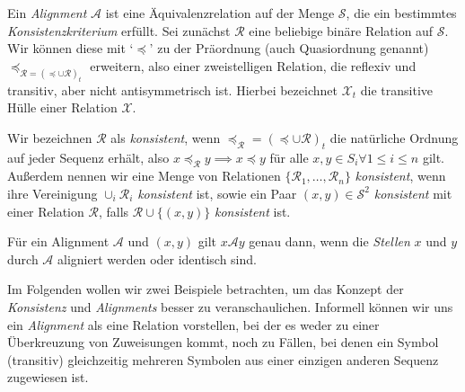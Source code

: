 \begin{definition}
	Ein \emph{Alignment} $\mathcal{A}$ ist eine Äquivalenzrelation auf der Menge $\mathcal{S}$, die ein bestimmtes \emph{Konsistenzkriterium} erfüllt. Sei zunächst $\mathcal{R}$ eine beliebige binäre Relation auf $\mathcal{S}$. Wir können diese mit `$\preceq$' zu der Präordnung (auch Quasiordnung genannt) $\preceq_{\mathcal{R}=(\preceq \cup \mathcal{R})_t}$ erweitern, also einer zweistelligen Relation, die reflexiv und transitiv, aber nicht antisymmetrisch ist. Hierbei bezeichnet $\mathcal{X}_t$ die transitive Hülle einer Relation $\mathcal{X}$. 
	
	Wir bezeichnen $\mathcal{R}$ als \emph{konsistent}, wenn $\preceq_{\mathcal{R}}=(\preceq \cup \mathcal{R})_t$ die natürliche Ordnung auf jeder Sequenz erhält, also $x \preceq_{\mathcal{R}} y \implies x \preceq y$ für alle $x,y \in S_i \forall 1\leq i \leq n$ gilt. Außerdem nennen wir eine Menge von Relationen $\{\mathcal{R}_1, \dots, \mathcal{R}_n\}$ \emph{konsistent}, wenn ihre Vereinigung $\cup_i \mathcal{R}_i$ \emph{konsistent} ist, sowie ein Paar $(x,y) \in \mathcal{S}^2$ \emph{konsistent} mit einer Relation $\mathcal{R}$, falls $\mathcal{R} \cup \{(x,y)\}$ \emph{konsistent} ist.
	
	Für ein Alignment $\mathcal{A}$ und $(x,y)$ gilt $x\mathcal{A}y$ genau dann, wenn die \emph{Stellen} $x$ und $y$ durch $\mathcal{A}$ aligniert werden oder identisch sind.
\end{definition}

Im Folgenden wollen wir zwei Beispiele betrachten, um das Konzept der \emph{Konsistenz} und \emph{Alignments} besser zu veranschaulichen. Informell können wir uns ein \emph{Alignment} als eine Relation vorstellen, bei der es weder zu einer Überkreuzung von Zuweisungen kommt, noch zu Fällen, bei denen ein Symbol (transitiv) gleichzeitig mehreren Symbolen aus einer einzigen anderen Sequenz zugewiesen ist.

